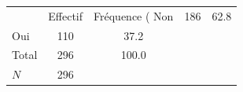 {
\def\sym#1{\ifmmode^{#1}\else\(^{#1}\)\fi}
\begin{tabular}{l*{1}{cc}}
\toprule
            &    Effectif&Fréquence (%
\midrule
Non         &         186&        62.8\\
Oui         &         110&        37.2\\
Total       &         296&       100.0\\
\midrule
\(N\)       &         296&            \\
\bottomrule
\end{tabular}
}
